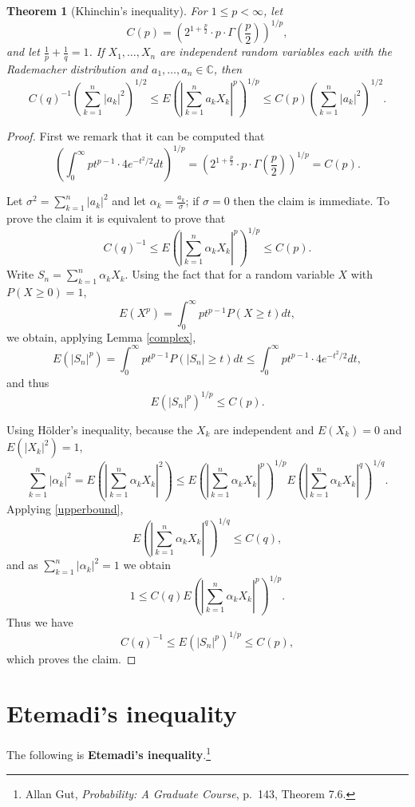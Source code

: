 \documentclass{article}
\newtheorem{theorem}{Theorem}
\theoremstyle{definition}
\begin{document}
\begin{theorem}[Khinchin's inequality]
For $1 \leq p < \infty$,
let 
\[
C(p)= \left(2^{1+\frac{p}{2}}  \cdot p \cdot \Gamma\left(\frac{p}{2}\right)\right)^{1/p},
\]
and let $\frac{1}{p}+\frac{1}{q}=1$.
If
$X_1,\ldots,X_n$ are independent random variables each with the Rademacher distribution
and $a_1,\ldots,a_n \in \mathbb{C}$, then
\[
C(q)^{-1} \left( \sum_{k=1}^n |a_k|^2 \right)^{1/2} \leq E\left( \left| \sum_{k=1}^n a_k X_k \right|^p \right)^{1/p}
\leq C(p) \left( \sum_{k=1}^n |a_k|^2 \right)^{1/2}.
\]
\end{theorem}
\begin{proof}
First we remark that it can be computed that
\[
\left( \int_0^\infty pt^{p-1} \cdot 4e^{-t^2/2} dt\right)^{1/p} = 
 \left(2^{1+\frac{p}{2}}  \cdot p \cdot \Gamma\left(\frac{p}{2}\right)\right)^{1/p} = C(p).
\]

Let $\sigma^2 = \sum_{k=1}^n |a_k|^2$ and let
$\alpha_k = \frac{a_k}{\sigma}$; if $\sigma=0$ then the claim is immediate. 
To prove the claim it is equivalent to prove that 
\[
C(q)^{-1} \leq  E\left( \left| \sum_{k=1}^n \alpha_k X_k \right|^p\right)^{1/p}
\leq C(p).
\]
Write $S_n=\sum_{k=1}^n \alpha_k X_k$. Using the fact that for a random variable $X$ with $P(X \geq 0)=1$,
\[
E(X^p) = \int_0^\infty p t^{p-1} P(X \geq t) dt,
\]
we obtain, applying Lemma \ref{complex},
\[
E(|S_n|^p)=\int_0^\infty pt^{p-1} P(|S_n| \geq t) dt
\leq \int_0^\infty pt^{p-1} \cdot 4e^{-t^2/2} dt,
\]
and thus
\begin{equation}
E(|S_n|^p)^{1/p} \leq C(p).
\label{upperbound}
\end{equation}

Using H\"older's inequality,
because the $X_k$ are independent and $E(X_k)=0$ and
$E(|X_k|^2)=1$,
\[
\sum_{k=1}^n |\alpha_k|^2=E\left( \left| \sum_{k=1}^n \alpha_k X_k\right|^2 \right)
\leq E\left( \left| \sum_{k=1}^n \alpha_k X_k\right|^p\right)^{1/p}
E\left( \left| \sum_{k=1}^n \alpha_k X_k\right|^q\right)^{1/q}.
\]
Applying \eqref{upperbound},
\[
E\left( \left| \sum_{k=1}^n \alpha_k X_k\right|^q\right)^{1/q}  \leq C(q),
\]
and as $\sum_{k=1}^n |\alpha_k|^2=1$ we obtain
\[
1 \leq C(q) E\left( \left| \sum_{k=1}^n \alpha_k X_k\right|^p\right)^{1/p}.
\]
Thus we have
\[
C(q)^{-1} \leq   E(|S_n|^p)^{1/p} \leq C(p),
\]
which proves the claim.
\end{proof}



\section{Etemadi's inequality}
The following is \textbf{Etemadi's inequality}.\footnote{Allan Gut, {\em Probability: A Graduate Course}, p.~143, Theorem 7.6.}
\end{document}

